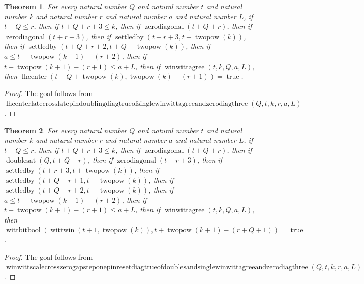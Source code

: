 \documentclass[11pt]{article}
\newtheorem{theorem}{Theorem}[section]
\theoremstyle{definition}
\begin{document}
\begin{theorem}
\label{ll:paper:lhcenter-late-cross-late-pin-doubling-diag-true-of-single-winwittagree-and-zero-diag-three}
For every natural number \(Q\) and natural number \(t\) and natural number \(k\) and natural number \(r\) and natural number \(a\) and natural number \(L\), if \(t + Q \le r\), then if \(t + Q + r + 3 \le k\), then if \(\operatorname{zerodiagonal}(t + Q + r)\), then if \(\operatorname{zerodiagonal}(t + r + 3)\), then if \(\operatorname{settledby}(t + r + 3, t + \operatorname{twopow}(k))\), then if \(\operatorname{settledby}(t + Q + r + 2, t + Q + \operatorname{twopow}(k))\), then if \(a \le t + \operatorname{twopow}(k + 1) - (r + 2)\), then if \(t + \operatorname{twopow}(k + 1) - (r + 1) \le a + L\), then if \(\operatorname{winwittagree}(t, k, Q, a, L)\), then \(\operatorname{lhcenter}(t + Q + \operatorname{twopow}(k), \operatorname{twopow}(k) - (r + 1)) = \operatorname{true}\).
\end{theorem}
\begin{proof}
The goal follows from \(\operatorname{lhcenterlatecrosslatepindoublingdiagtrueofsinglewinwittagreeandzerodiagthree}(Q, t, k, r, a, L)\).
\end{proof}
\begin{theorem}
\label{ll:paper:winwitt-scale-cross-zero-gap-step-one-pin-reset-diag-true-of-doubles-and-single-winwittagree-and-zero-diag-three}
For every natural number \(Q\) and natural number \(t\) and natural number \(k\) and natural number \(r\) and natural number \(a\) and natural number \(L\), if \(t + Q \le r\), then if \(t + Q + r + 3 \le k\), then if \(\operatorname{zerodiagonal}(t + Q + r)\), then if \(\operatorname{doublesat}(Q, t + Q + r)\), then if \(\operatorname{zerodiagonal}(t + r + 3)\), then if \(\operatorname{settledby}(t + r + 3, t + \operatorname{twopow}(k))\), then if \(\operatorname{settledby}(t + Q + r + 1, t + \operatorname{twopow}(k))\), then if \(\operatorname{settledby}(t + Q + r + 2, t + \operatorname{twopow}(k))\), then if \(a \le t + \operatorname{twopow}(k + 1) - (r + 2)\), then if \(t + \operatorname{twopow}(k + 1) - (r + 1) \le a + L\), then if \(\operatorname{winwittagree}(t, k, Q, a, L)\), then \(\operatorname{wittbitbool}(\operatorname{wittwin}(t + 1, \operatorname{twopow}(k)), t + \operatorname{twopow}(k + 1) - (r + Q + 1)) = \operatorname{true}\).
\end{theorem}
\begin{proof}
The goal follows from \(\operatorname{winwittscalecrosszerogapsteponepinresetdiagtrueofdoublesandsinglewinwittagreeandzerodiagthree}(Q, t, k, r, a, L)\).
\end{proof}
\end{document}
